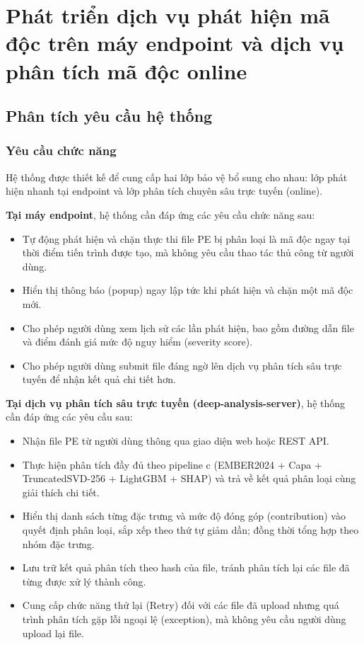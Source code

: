 \chapter{Phát triển dịch vụ phát hiện mã độc trên máy endpoint và dịch vụ phân tích mã độc online}

\section{Phân tích yêu cầu hệ thống}

\subsection{Yêu cầu chức năng}

Hệ thống được thiết kế để cung cấp hai lớp bảo vệ bổ sung cho nhau:
lớp phát hiện nhanh tại endpoint và lớp phân tích chuyên sâu trực
tuyến (online).

\textbf{Tại máy endpoint}, hệ thống cần đáp ứng các yêu cầu chức năng
sau:
\begin{itemize}
    \item Tự động phát hiện và chặn thực thi file PE bị phân loại là
        mã độc ngay tại thời điểm tiến trình được tạo, mà không yêu
        cầu thao tác thủ công từ người dùng.
    \item Hiển thị thông báo (popup) ngay lập tức khi phát hiện và
        chặn một mã độc mới.
    \item Cho phép người dùng xem lịch sử các lần phát hiện, bao gồm
        đường dẫn file và điểm đánh giá mức độ nguy hiểm
        (severity score).
    \item Cho phép người dùng submit file đáng ngờ lên dịch vụ phân
        tích sâu trực tuyến để nhận kết quả chi tiết hơn.
\end{itemize}

\textbf{Tại dịch vụ phân tích sâu trực tuyến
(deep-analysis-server)}, hệ thống cần đáp ứng các yêu cầu sau:
\begin{itemize}
    \item Nhận file PE từ người dùng thông qua giao diện web hoặc
        REST API.
    \item Thực hiện phân tích đầy đủ theo pipeline c (EMBER2024 +
        Capa + TruncatedSVD-256 + LightGBM + SHAP) và trả về kết quả
        phân loại cùng giải thích chi tiết.
    \item Hiển thị danh sách từng đặc trưng và mức độ đóng góp
        (contribution) vào quyết định phân loại, sắp xếp theo thứ tự
        giảm dần; đồng thời tổng hợp theo nhóm đặc trưng.
    \item Lưu trữ kết quả phân tích theo hash của file, tránh phân
        tích lại các file đã từng được xử lý thành công.
    \item Cung cấp chức năng thử lại (Retry) đối với các file đã
        upload nhưng quá trình phân tích gặp lỗi ngoại lệ (exception), mà không
        yêu cầu người dùng upload lại file.
\end{itemize}




